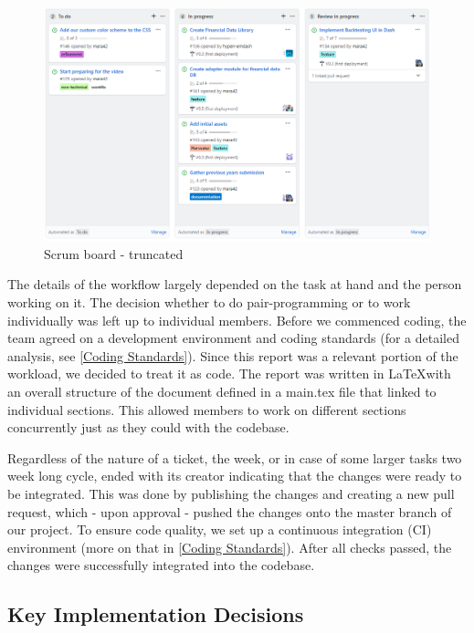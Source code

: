 \documentclass[main.tex]{subfiles}
\begin{document}
\begin{figure}[H]
   \centering
   \includegraphics[width=\textwidth]{05Coding/05Pictures/scrumboard.png}
   \caption{Scrum board - truncated}
   \label{Scrum}
\end{figure}

The details of the workflow largely depended on the task at hand and the person working on it. The decision whether to do pair-programming or to work individually was left up to individual members. Before we commenced coding, the team agreed on a development environment and coding standards (for a detailed analysis, see \ref{Coding Standards}). Since this report was a relevant portion of the workload, we decided to treat it as code. The report was written in \LaTeX with an overall structure of the document defined in a main.tex file that linked to individual sections. This allowed members to work on different sections concurrently just as they could with the codebase.

Regardless of the nature of a ticket, the week, or in case of some larger tasks two week long cycle, ended with its creator indicating that the changes were ready to be integrated. This was done by publishing the changes and creating a new pull request, which - upon approval - pushed the changes onto the master branch of our project. To ensure code quality, we set up a continuous integration (CI) environment (more on that in \ref{Coding Standards}). After all checks passed, the changes were successfully integrated into the codebase.

\subsection{Key Implementation Decisions}
\end{document}
